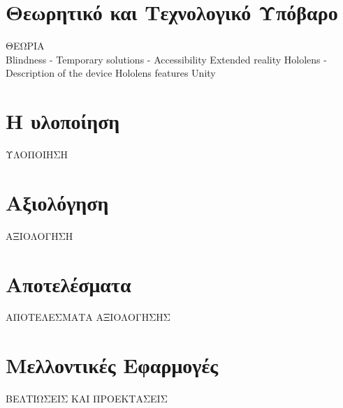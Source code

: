 \documentclass[a4paper,11pt,twoside]{book}
\author{\me}
\begin{document}
\setcounter{page}{3}



\clearemptydoublepage



\clearemptydoublepage



\clearemptydoublepage



\clearemptydoublepage



\clearemptydoublepage



\clearemptydoublepage

\pagestyle{fancy}

\tableofcontents
\clearemptydoublepage
\listoffigures
\clearemptydoublepage
\listoftables
\clearemptydoublepage


\setcounter{page}{1}



\clearemptydoublepage

\chapter{Θεωρητικό και Τεχνολογικό Υπόβαρο}\label{ch:chap2}
{\LARGE ΘΕΩΡΙΑ}\\
Blindness
- Temporary solutions
- Accessibility
Extended reality
Hololens
- Description of the device
Hololens features
Unity

\clearemptydoublepage

\chapter{Η υλοποίηση}\label{ch:chap3}
{\LARGE ΥΛΟΠΟΙΗΣΗ}


\clearemptydoublepage

\chapter{Αξιολόγηση}\label{ch:chap4}
{\LARGE ΑΞΙΟΛΟΓΗΣΗ}
\clearemptydoublepage

\chapter{Αποτελέσματα}\label{ch:chap5}
{\LARGE ΑΠΟΤΕΛΕΣΜΑΤΑ ΑΞΙΟΛΟΓΗΣΗΣ}
\clearemptydoublepage

\chapter{Μελλοντικές Εφαρμογές}\label{ch:chap6}
{\LARGE ΒΕΛΤΙΩΣΕΙΣ ΚΑΙ ΠΡΟΕΚΤΑΣΕΙΣ}


\clearemptydoublepage


\end{document}

